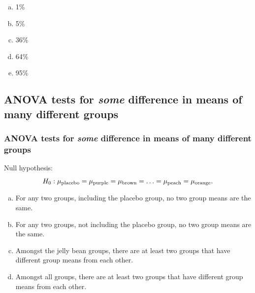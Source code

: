 \documentclass[11pt,containsverbatim,handout,xcolor=xelatex,dvipsnames,table]{beamer}
\newcommand{\solnMult}[1]{#1}
\newcommand{\soln}[1]{}
\begin{document}

\begin{frame}
\frametitle{}
  

\begin{enumerate}[(a)]
\item 1\%
\item 5\%
\item 36\%
\item \solnMult{64\%} \onslide<2>{\soln{\red{$\rightarrow~1 - (1 - 0.05)^{20}$}}}
\item 95\%
\end{enumerate}
 
\end{frame}


\subsection{ANOVA tests for \emph{some} difference in means of many different groups}
\label{mi2}


\begin{frame}
  \frametitle{ANOVA tests for \emph{some} difference in means of many different groups}

Null hypothesis:
\[
H_0: \mu_{\textmd{placebo}} = \mu_{\textmd{purple}} = \mu_{\textmd{brown}} =
\ldots = \mu_{\textmd{peach}} = \mu_{\textmd{orange}} .
\]


\begin{enumerate}[(a)]
\item For any two groups, including the placebo group, no two group means are the same.
\item For any two groups, not including the placebo group, no two group means are the same.
\item Amongst the jelly bean groups, there are at least two groups that have different group means from each other.
\item \solnMult{Amongst all groups, there are at least two groups that have different group means from each other.}
\end{enumerate}

\end{frame}
\end{document}
